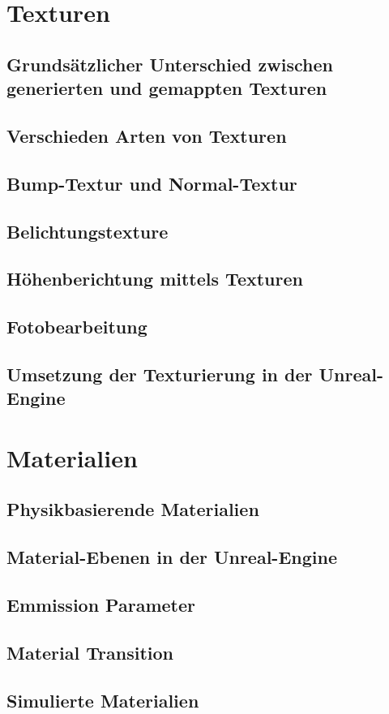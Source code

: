 \section{Texturen}
\subsection{Grundsätzlicher Unterschied zwischen generierten und gemappten Texturen}
\subsection{Verschieden Arten von Texturen}
\subsection{Bump-Textur und Normal-Textur}
\subsection{Belichtungstexture}
\subsection{Höhenberichtung mittels Texturen}
\subsection{Fotobearbeitung}
\subsection{Umsetzung der Texturierung in der Unreal-Engine}

\section{Materialien}
\subsection{Physikbasierende Materialien}
\subsection{Material-Ebenen in der Unreal-Engine}
\subsection{Emmission Parameter}
\subsection{Material Transition}
\subsection{Simulierte Materialien}
